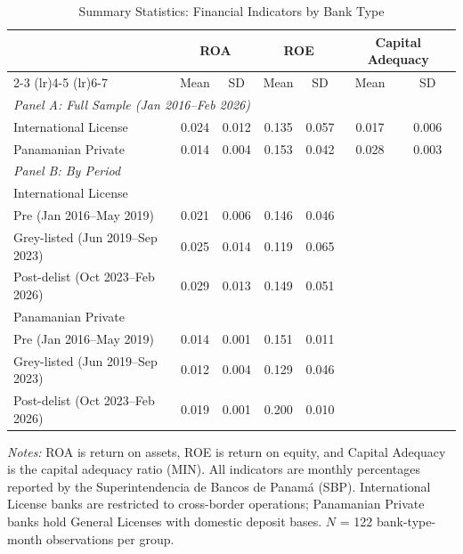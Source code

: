 \begin{table}[H]
\centering
\caption{Summary Statistics: Financial Indicators by Bank Type}
\label{tab:summary}
\begin{threeparttable}
\begin{tabular}{lcccccc}
\toprule
 & \multicolumn{2}{c}{ROA} & \multicolumn{2}{c}{ROE} & \multicolumn{2}{c}{Capital Adequacy} \\
\cmidrule(lr){2-3} \cmidrule(lr){4-5} \cmidrule(lr){6-7}
 & Mean & SD & Mean & SD & Mean & SD \\
\midrule
\multicolumn{7}{l}{\textit{Panel A: Full Sample (Jan 2016--Feb 2026)}} \\[3pt]
International License & 0.024 & 0.012 & 0.135 & 0.057 & 0.017 & 0.006 \\
Panamanian Private & 0.014 & 0.004 & 0.153 & 0.042 & 0.028 & 0.003 \\
\midrule
\multicolumn{7}{l}{\textit{Panel B: By Period}} \\[3pt]
\multicolumn{7}{l}{\quad International License} \\
\quad\quad Pre (Jan 2016--May 2019) & 0.021 & 0.006 & 0.146 & 0.046 & & \\
\quad\quad Grey-listed (Jun 2019--Sep 2023) & 0.025 & 0.014 & 0.119 & 0.065 & & \\
\quad\quad Post-delist (Oct 2023--Feb 2026) & 0.029 & 0.013 & 0.149 & 0.051 & & \\
\multicolumn{7}{l}{\quad Panamanian Private} \\
\quad\quad Pre (Jan 2016--May 2019) & 0.014 & 0.001 & 0.151 & 0.011 & & \\
\quad\quad Grey-listed (Jun 2019--Sep 2023) & 0.012 & 0.004 & 0.129 & 0.046 & & \\
\quad\quad Post-delist (Oct 2023--Feb 2026) & 0.019 & 0.001 & 0.200 & 0.010 & & \\
\bottomrule
\end{tabular}
\begin{tablenotes}[flushleft]
\small
\item \textit{Notes:} ROA is return on assets, ROE is return on equity, and Capital Adequacy is the capital adequacy ratio (MIN). All indicators are monthly percentages reported by the Superintendencia de Bancos de Panam\'a (SBP). International License banks are restricted to cross-border operations; Panamanian Private banks hold General Licenses with domestic deposit bases. $N$ = 122 bank-type-month observations per group.
\end{tablenotes}
\end{threeparttable}
\end{table}
